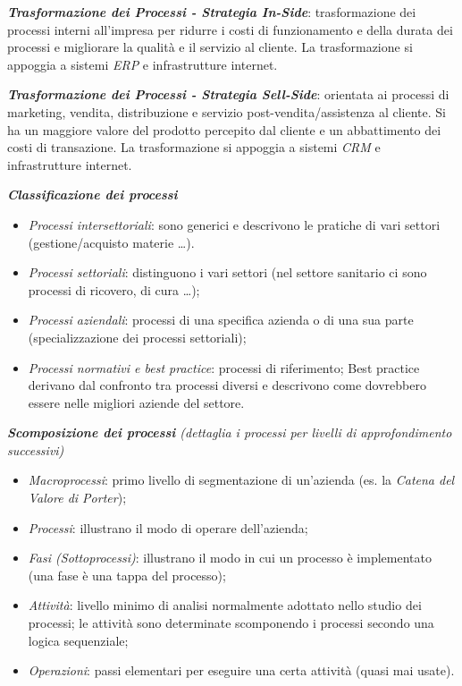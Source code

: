 \documentclass[a4paper, notitlepage, 9pt]{extreport}
\begin{document}
\noindent
\textit{\textbf{Trasformazione dei Processi - Strategia In-Side}}: trasformazione dei processi interni all’impresa per ridurre i costi di funzionamento e della durata dei processi e migliorare la qualità e il servizio al cliente. La trasformazione si appoggia a sistemi \textit{ERP} e infrastrutture internet.

\noindent
\textit{\textbf{Trasformazione dei Processi - Strategia Sell-Side}}: orientata ai processi di marketing, vendita, distribuzione e servizio post-vendita/assistenza al cliente. Si ha un maggiore valore del prodotto percepito dal cliente e un abbattimento dei costi di transazione. La trasformazione si appoggia a sistemi \textit{CRM} e infrastrutture internet.
\newline

\noindent
\textit{\textbf{Classificazione dei processi}}
\begin{itemize}
	\item \textit{Processi intersettoriali}: sono generici e descrivono le pratiche di vari settori (gestione/acquisto materie \dots).
	\item \textit{Processi settoriali}: distinguono i vari settori (nel settore sanitario ci sono processi di ricovero, di cura \dots);
	\item \textit{Processi aziendali}: processi di una specifica azienda o di una sua parte (specializzazione dei processi settoriali);
	\item \textit{Processi normativi e best practice}: processi di riferimento; Best practice derivano dal confronto tra processi diversi e descrivono come dovrebbero essere nelle migliori aziende del settore.
\end{itemize}
\textit{\textbf{Scomposizione dei processi} (dettaglia i processi per livelli di approfondimento successivi)}
\begin{itemize}
	\item \textit{Macroprocessi}: primo livello di segmentazione di un’azienda (es. la \textit{Catena del Valore di Porter});
	\item \textit{Processi}: illustrano il modo di operare dell’azienda;
	\item \textit{Fasi (Sottoprocessi)}: illustrano il modo in cui un processo è implementato (una fase è una tappa del processo);
	\item \textit{Attività}: livello minimo di analisi normalmente adottato nello studio dei processi; le attività sono determinate scomponendo i processi secondo una logica sequenziale;
	\item \textit{Operazioni}: passi elementari per eseguire una certa attività (quasi mai usate).
\end{itemize}
\end{document}
